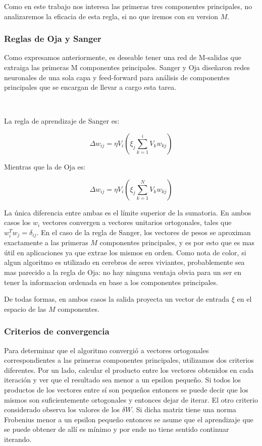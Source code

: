 \documentclass[informe.tex]{subfiles}
\begin{document}
	Como en este trabajo nos interesa las primeras tres componentes principales, no analizaremos la eficacia de esta regla, si no que iremos con su version $M$.
      
      \subsubsection{Reglas de Oja y Sanger}
	Como expresamos anteriormente, es deseable tener una red de M-salidas que extraiga las primeras M componentes principales. Sanger y Oja diseñaron redes neuronales de una sola capa y feed-forward para análisis de componentes principales que se encargan de llevar a cargo esta tarea.
	
	~
	
	La regla de aprendizaje de Sanger es:

	$$\Delta w_{ij} = \eta V_i(\xi_j \sum_{k=1}^{i} V_k w_{kj} )$$

	Mientras que la de Oja es:

	$$\Delta w_{ij} = \eta V_i(\xi_j \sum_{k=1}^{N} V_k w_{kj} )$$

	La única diferencia entre ambas es el límite superior de la sumatoria. En ambos casos los $w_i$ vectores convergen a vectores unitarios ortogonales, tales que $w^{T}_i w_j = \delta_{ij}$. En el caso de la regla de Sanger, los vectores de pesos se aproximan exactamente a las primeras $M$ componentes principales, y es por esto que es mas \'util en aplicaciones ya que extrae los mismos en orden. Como nota de color, si algun algoritmo es utilizado en cerebros de seres viviantes, probablemente sea mas parecido a la regla de Oja: no hay ninguna ventaja obvia para un ser en tener la informacion ordenada en base a los componentes principales. 

	De todas formas, en ambos casos la salida proyecta un vector de entrada $\xi$ en el espacio de las $M$ componentes.
	
      \subsubsection{Criterios de convergencia}
	Para determinar que el algoritmo convergió a vectores ortogonales correspondientes a las primeras componentes principales, utilizamos dos criterios diferentes. Por un lado, calcular el producto entre los vectores obtenidos en cada iteración y ver que el resultado sea menor a un epsilon pequeño. Si todos los productos de los vectores entre sí son pequeños entonces se puede decir que los mismos son suficientemente ortogonales y entonces dejar de iterar. El otro criterio considerado observa los valores de los $\delta W$. Si dicha matriz tiene una norma Frobenius menor a un epsilon pequeño entonces se asume que el aprendizaje que se puede obtener de allí es mínimo y por ende no tiene sentido continuar iterando.
	
\end{document}
